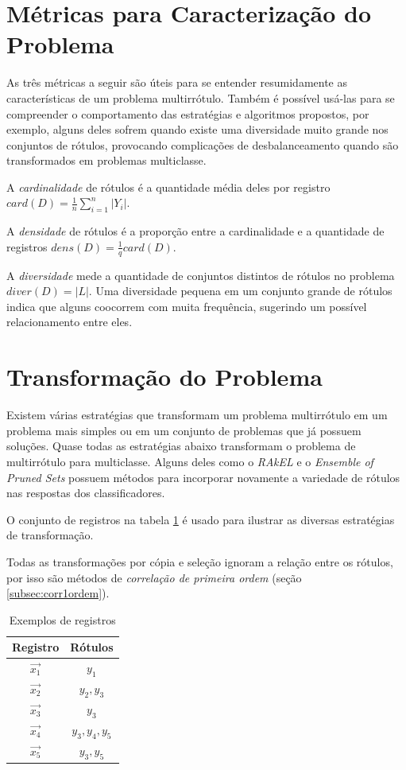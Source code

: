 \documentclass[runningheads,a4paper]{llncs}
\begin{document}
\section{Métricas para Caracterização do Problema} \label{sec:metricas}

As três métricas a seguir \cite{Zhang2014-be} são úteis para se entender resumidamente as características de um problema multirrótulo. Também é possível usá-las para se compreender o comportamento das estratégias e algoritmos propostos, por exemplo, alguns deles sofrem quando existe uma diversidade muito grande nos conjuntos de rótulos, provocando complicações de desbalanceamento quando são transformados em problemas multiclasse. 

A \textit{cardinalidade} de rótulos é a quantidade média deles por registro $card(D) = \frac{1}{n} \sum_{i = 1}^{n} |Y_i|$.

A \textit{densidade} de rótulos é a proporção entre a cardinalidade e a quantidade de registros $dens(D) = \frac{1}{q} card(D)$.

A \textit{diversidade} mede a quantidade de conjuntos distintos de rótulos no problema $diver(D) = |L|$. Uma diversidade pequena em um conjunto grande de rótulos indica que alguns coocorrem com muita frequência, sugerindo um possível relacionamento entre eles.

\section{Transformação do Problema}\label{sec:transprob}

Existem várias estratégias que transformam um problema multirrótulo em um problema mais simples ou em um conjunto de problemas que já possuem soluções. Quase todas as estratégias abaixo transformam o problema de multirrótulo para multiclasse. Alguns deles como o \textit{RAkEL} \cite{Tsoumakas2007-wm} e o \textit{Ensemble of Pruned Sets} \cite{Read2008-bt} possuem métodos para incorporar novamente a variedade de rótulos nas respostas dos classificadores.

O conjunto de registros na tabela \ref{tab:exbase} é usado para ilustrar as diversas estratégias de transformação.

Todas as transformações por cópia e seleção ignoram a relação entre os rótulos, por isso são métodos de \textit{correlação de primeira ordem} (seção \ref{subsec:corr1ordem}).

\begin{table}
	\centering
	\begin{tabular}{| c | c |}
		\hline
		\textbf{Registro} & \textbf{Rótulos} \\
		\hline
		$\vec{x_1}$ & $y_1$ \\
		\hline
		$\vec{x_2}$ & $y_2, y_3$ \\
		\hline
		$\vec{x_3}$ & $y_3$ \\
		\hline
		$\vec{x_4}$ & $y_3, y_4, y_5$ \\
		\hline
		$\vec{x_5}$ & $y_3, y_5$ \\
		\hline
	\end{tabular}
	\caption{Exemplos de registros}
	\label{tab:exbase}
\end{table}
\end{document}

